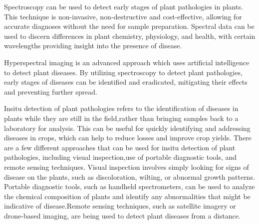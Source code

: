 \documentclass{article}
\begin{document}
{            Spectroscopy can be used to detect early stages of plant pathologies in plants. This technique is non-invasive, non-destructive and cost-effective, allowing for accurate diagnoses without the need for sample preparation. Spectral data can be used to discern differences in plant chemistry, physiology, and health, with certain wavelengths providing insight into the presence of disease. \par
            Hyperspectral imaging is an advanced approach which uses artificial intelligence to detect plant diseases. By utilizing spectroscopy to detect plant pathologies, early stages of diseases can be identified and eradicated, mitigating their effects and preventing further spread.\par
            Insitu detection of plant pathologies refers to the identification of diseases in plants while they are still in the field,rather than bringing samples back to a laboratory for analysis. This can be useful for quickly identifying and addressing diseases in crops, which can help to reduce losses and improve crop yields. There are a few different approaches that can be used for insitu detection of plant pathologies, including visual inspection,use of portable diagnostic tools, and remote sensing techniques. Visual inspection involves simply looking for signs of disease on the plants, such as discoloration, wilting, or abnormal growth patterns. Portable diagnostic tools, such as handheld spectrometers, can be used to analyze the chemical composition of plants and identify any abnormalities that might be indicative of disease.Remote sensing techniques, such as satellite imagery or drone-based imaging, are being used to detect plant diseases from a distance.\par
            \newpage
            
}
\end{document}
